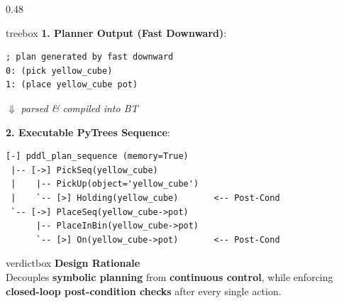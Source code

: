 \documentclass[10pt]{beamer}
\begin{document}
\begin{frame}[fragile]
\begin{columns}[T]
\begin{column}{0.48\textwidth}
\begin{beamercolorbox}[sep=4.5pt,rounded=true,shadow=true]{treebox}
            \tiny \textbf{1. Planner Output (Fast Downward)}:
            \begin{verbatim}
; plan generated by fast downward
0: (pick yellow_cube)
1: (place yellow_cube pot)
            \end{verbatim}

            \vspace{-0.25cm}
            \centering \tiny $\boldsymbol{\Downarrow}$ \textit{parsed \& compiled into BT} \par
            \vspace{0.06cm}

            \raggedright \tiny \textbf{2. Executable PyTrees Sequence}:
            \fontsize{4.6pt}{5.4pt}\selectfont
            \begin{verbatim}
[-] pddl_plan_sequence (memory=True)
 |-- [->] PickSeq(yellow_cube)
 |    |-- PickUp(object='yellow_cube')
 |    `-- [>] Holding(yellow_cube)       <-- Post-Cond
 `-- [->] PlaceSeq(yellow_cube->pot)
      |-- PlaceInBin(yellow_cube->pot)
      `-- [>] On(yellow_cube->pot)       <-- Post-Cond
            \end{verbatim}
        \end{beamercolorbox}

        \vspace{0.10cm}
        \begin{beamercolorbox}[sep=3.5pt,shadow=true,rounded=true]{verdictbox}
            \scriptsize \textbf{Design Rationale} \\
            \tiny Decouples \textbf{symbolic planning} from \textbf{continuous control}, while enforcing \textbf{closed-loop post-condition checks} after every single action.
        \end{beamercolorbox}
    \end{column}
\end{columns}
\end{frame}
\end{document}

